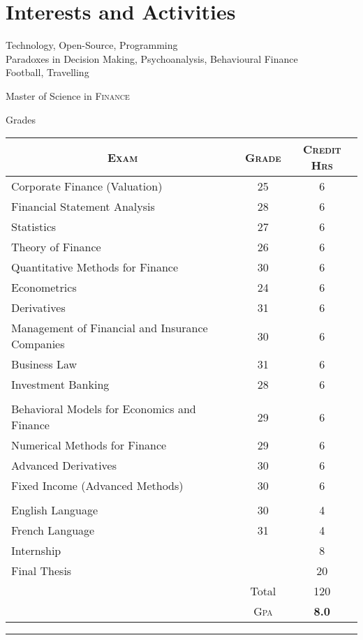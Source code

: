 \documentclass[a4paper,10pt]{article} %
\begin{document}

\section{Interests and Activities}

Technology, Open-Source, Programming\\
Paradoxes in Decision Making, Psychoanalysis, Behavioural Finance\\
Football, Travelling


\newpage


\par{\centering\Large \hypertarget{grds}{Master of Science in \textsc{Finance}}\par}\large{\centering Grades\par}\normalsize

\begin{center}
\begin{tabular}{lcc}
\multicolumn{1}{c}{\textsc{Exam}} & \textsc{Grade}&\textsc{Credit Hrs}\\ \hline
Corporate Finance (Valuation) & 25 & 6\\
Financial Statement Analysis & 28 & 6\\
Statistics & 27 & 6\\
Theory of Finance & 26 & 6\\
Quantitative Methods for Finance & 30 & 6\\
Econometrics & 24 & 6\\
Derivatives & 31 & 6\\
Management of Financial and Insurance Companies & 30 & 6\\
Business Law & 31 & 6\\
Investment Banking	& 28 & 6\\ \\		
Behavioral Models for Economics and Finance	 & 29 & 6\\
Numerical Methods for Finance & 29 & 6\\
Advanced Derivatives & 30 & 6\\
Fixed Income (Advanced Methods) & 30 & 6\\ \\
English Language & 30 &	4\\
French Language & 31 &	4\\	
Internship & & 8\\		
Final Thesis & & 20\\	
& Total & 120\\\cline{2-3}
&\textsc{Gpa}&\textbf{8.0}
\end{tabular}
\end{center}
\bigskip
\hrule
\bigskip
\end{document}
